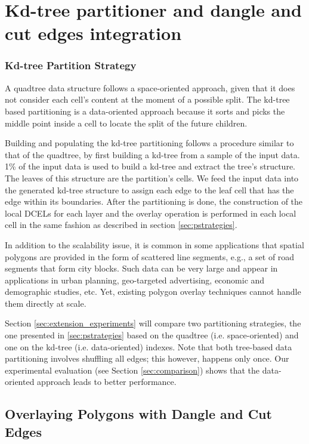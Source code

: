 \section{Kd-tree partitioner and dangle and cut edges integration} \label{sec:extension_methods}

\subsubsection{Kd-tree Partition Strategy} \label{sec:kdtreestrategy}
A quadtree data structure follows a space-oriented approach, given that it does not  consider each cell's content at the moment of a possible split.  The kd-tree based partitioning is a data-oriented approach because it sorts and picks the middle point inside a cell to locate the split of the future children.

Building and populating the kd-tree partitioning follows a procedure similar to that of the quadtree, by first building a kd-tree from a sample of the input data.  1\% of the input data is used to build a kd-tree and extract the tree's structure.  The leaves of this structure are the partition's cells.  We feed the input data into the generated kd-tree structure to assign each edge to the leaf cell that has the edge within its boundaries.  After the partitioning is done, the construction of the local DCELs for each layer and the overlay operation is performed in each local cell in the same fashion as described in section \ref{sec:pstrategies}.

In addition to the scalability issue, it is common in some applications that spatial polygons are provided in the form of scattered line segments, e.g., a set of road segments that form city blocks.  Such data can be very large and appear in applications in urban planning, geo-targeted advertising, economic and demographic studies, etc.  Yet, existing polygon overlay techniques cannot handle them directly at scale.  

Section \ref{sec:extension_experiments} will compare two partitioning strategies, the one presented in \ref{sec:pstrategies} based on the quadtree (i.e. space-oriented) and one on the kd-tree (i.e. data-oriented) indexes.  Note that both tree-based data partitioning involves shuffling all edges; this however, happens only once. Our experimental evaluation (see Section \ref{sec:comparison}) shows that the data-oriented approach leads to better performance. 

\subsection{Overlaying Polygons with Dangle and Cut Edges} \label{sec:over_dang}

